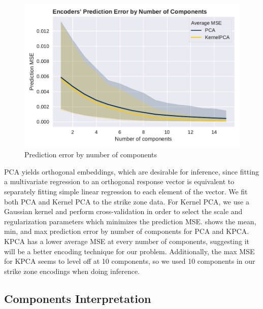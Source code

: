 \documentclass[letterpaper,12pt]{article}
\begin{document}
\begin{figure} 
\centering
\vspace{-0.5cm}
  \includegraphics[scale=0.5]{fig/encoder_results.pdf}
  \vspace{-1cm}
  \caption{Prediction error by number of components}
  \label{fig:encoders}
\end{figure}
PCA yields orthogonal embeddings, which are desirable for inference, since fitting a multivariate regression to an orthogonal response vector is equivalent to separately fitting simple linear regression to each element of the vector.
We fit both PCA and Kernel PCA to the strike zone data. 
For Kernel PCA, we use a Gaussian kernel and perform cross-validation in order to select the scale and regularization parameters which minimizes the prediction MSE. 
 shows the mean, min, and max prediction error by number of components for PCA and KPCA.
KPCA has a lower average MSE at every number of components, suggesting it will be a better encoding technique for our problem. 
Additionally, the max MSE for KPCA seems to level off at 10 components, so we used 10 components in our strike zone encodings when doing inference. 

\subsection{Components Interpretation}
\end{document}
